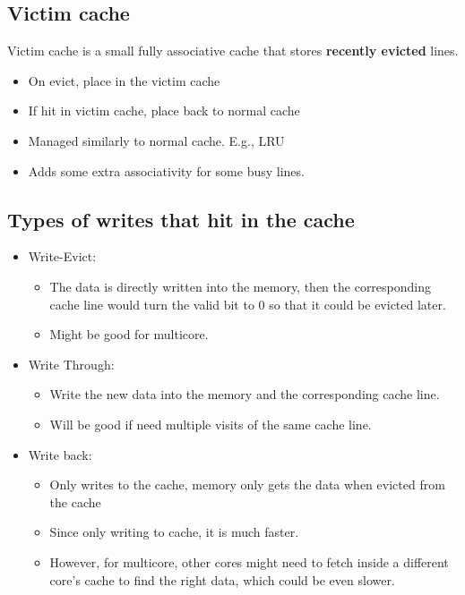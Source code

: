 \documentclass[letterpaper,12pt]{article}
\begin{document}
\subsection{Victim cache}

Victim cache is a small fully associative cache that stores \textbf{recently evicted} lines.
\begin{itemize}
    \item On evict, place in the victim cache
    \item If hit in victim cache, place back to normal cache
    \item Managed similarly to normal cache. E.g., LRU
    \item Adds some extra associativity for some busy lines.
\end{itemize}

\subsection{Types of writes that hit in the cache}

\begin{itemize}
    \item Write-Evict:
          \begin{itemize}
              \item The data is directly written into the memory, then the corresponding cache line would turn the valid bit to 0 so that it could be evicted later.
              \item Might be good for multicore.
          \end{itemize}
    \item Write Through:
          \begin{itemize}
              \item Write the new data into the memory and the corresponding cache line.
              \item Will be good if need multiple visits of the same cache line.
          \end{itemize}
    \item Write back:
          \begin{itemize}
              \item Only writes to the cache, memory only gets the data when evicted from the cache
              \item Since only writing to cache, it is much faster.
              \item However, for multicore, other cores might need to fetch inside a different core's cache to find the right data, which could be even slower.
          \end{itemize}
\end{itemize}
\end{document}
